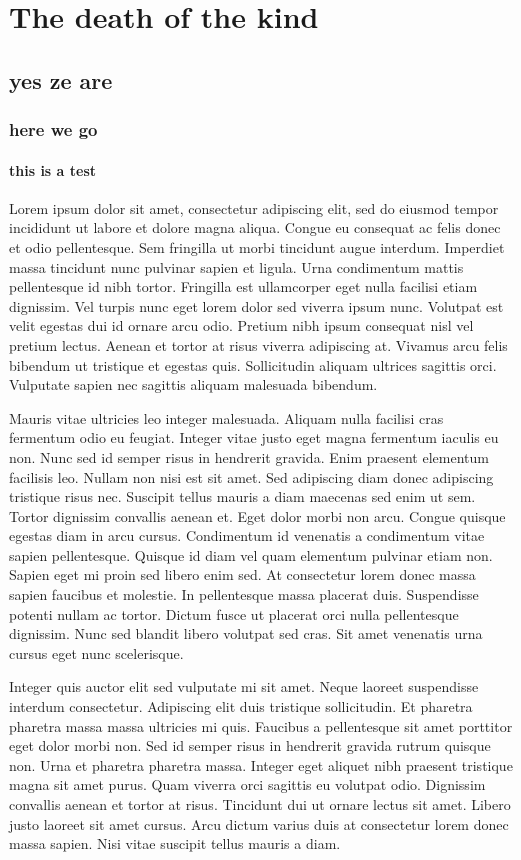 \documentclass[../Thesis]{subfiles}
\begin{document}
\chapter{The death of the kind}
\section{yes ze are}
\subsection{here we go}
\subsubsection{this is a test}
Lorem ipsum dolor sit amet, consectetur adipiscing elit, sed do eiusmod tempor incididunt ut labore et dolore magna aliqua. Congue eu consequat ac felis donec et odio pellentesque. Sem fringilla ut morbi tincidunt augue interdum. Imperdiet massa tincidunt nunc pulvinar sapien et ligula. Urna condimentum mattis pellentesque id nibh tortor. Fringilla est ullamcorper eget nulla facilisi etiam dignissim. Vel turpis nunc eget lorem dolor sed viverra ipsum nunc. Volutpat est velit egestas dui id ornare arcu odio. Pretium nibh ipsum consequat nisl vel pretium lectus. Aenean et tortor at risus viverra adipiscing at. Vivamus arcu felis bibendum ut tristique et egestas quis. Sollicitudin aliquam ultrices sagittis orci. Vulputate sapien nec sagittis aliquam malesuada bibendum.

Mauris vitae ultricies leo integer malesuada. Aliquam nulla facilisi cras fermentum odio eu feugiat. Integer vitae justo eget magna fermentum iaculis eu non. Nunc sed id semper risus in hendrerit gravida. Enim praesent elementum facilisis leo. Nullam non nisi est sit amet. Sed adipiscing diam donec adipiscing tristique risus nec. Suscipit tellus mauris a diam maecenas sed enim ut sem. Tortor dignissim convallis aenean et. Eget dolor morbi non arcu. Congue quisque egestas diam in arcu cursus. Condimentum id venenatis a condimentum vitae sapien pellentesque. Quisque id diam vel quam elementum pulvinar etiam non. Sapien eget mi proin sed libero enim sed. At consectetur lorem donec massa sapien faucibus et molestie. In pellentesque massa placerat duis. Suspendisse potenti nullam ac tortor. Dictum fusce ut placerat orci nulla pellentesque dignissim. Nunc sed blandit libero volutpat sed cras. Sit amet venenatis urna cursus eget nunc scelerisque.

Integer quis auctor elit sed vulputate mi sit amet. Neque laoreet suspendisse interdum consectetur. Adipiscing elit duis tristique sollicitudin. Et pharetra pharetra massa massa ultricies mi quis. Faucibus a pellentesque sit amet porttitor eget dolor morbi non. Sed id semper risus in hendrerit gravida rutrum quisque non. Urna et pharetra pharetra massa. Integer eget aliquet nibh praesent tristique magna sit amet purus. Quam viverra orci sagittis eu volutpat odio. Dignissim convallis aenean et tortor at risus. Tincidunt dui ut ornare lectus sit amet. Libero justo laoreet sit amet cursus. Arcu dictum varius duis at consectetur lorem donec massa sapien. Nisi vitae suscipit tellus mauris a diam.
\end{document}
